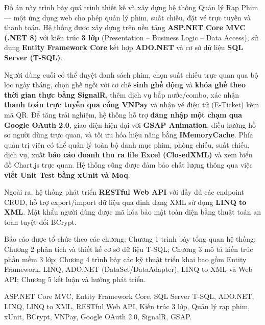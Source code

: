 \documentclass[12pt,a4paper,oneside]{book}
\theoremstyle{plain}
\numberwithin{equation}{chapter}
\begin{document}
Đồ án này trình bày quá trình thiết kế và xây dựng hệ thống Quản lý Rạp Phim --- một ứng dụng web cho phép quản lý phim, suất chiếu, đặt vé trực tuyến và thanh toán. Hệ thống được xây dựng trên nền tảng \textbf{ASP.NET Core MVC (.NET 8)} với kiến trúc \textbf{3 lớp} (Presentation -- Business Logic -- Data Access), sử dụng \textbf{Entity Framework Core} kết hợp \textbf{ADO.NET} và cơ sở dữ liệu \textbf{SQL Server (T-SQL)}.

Người dùng cuối có thể duyệt danh sách phim, chọn suất chiếu trực quan qua bộ lọc ngày tháng, chọn ghế ngồi với cơ chế \textbf{sinh ghế động} và \textbf{khóa ghế theo thời gian thực bằng SignalR}, thêm dịch vụ bắp nước/combo, xác nhận \textbf{thanh toán trực tuyến qua cổng VNPay} và nhận vé điện tử (E-Ticket) kèm mã QR. Để tăng trải nghiệm, hệ thống hỗ trợ \textbf{đăng nhập một chạm qua Google OAuth 2.0}, giao diện hiện đại với \textbf{GSAP Animation}, điều hướng hồ sơ người dùng trực quan, và tối ưu hóa hiệu năng bằng \textbf{IMemoryCache}. Phía quản trị viên có thể quản lý toàn bộ danh mục phim, phòng chiếu, suất chiếu, dịch vụ, xuất \textbf{báo cáo doanh thu ra file Excel (ClosedXML)} và xem biểu đồ Chart.js trực quan. Hệ thống cũng được đảm bảo chất lượng thông qua việc \textbf{viết Unit Test bằng xUnit và Moq}.

Ngoài ra, hệ thống phát triển \textbf{RESTful Web API} với đầy đủ các endpoint CRUD, hỗ trợ export/import dữ liệu qua định dạng XML sử dụng \textbf{LINQ to XML}. Mật khẩu người dùng được mã hóa bảo mật toàn diện bằng thuật toán an toàn tuyệt đối BCrypt.

Báo cáo được tổ chức theo các chương: Chương 1 trình bày tổng quan hệ thống; Chương 2 phân tích và thiết kế cơ sở dữ liệu T-SQL; Chương 3 mô tả kiến trúc phần mềm 3 lớp; Chương 4 trình bày các kỹ thuật triển khai bao gồm Entity Framework, LINQ, ADO.NET (DataSet/DataAdapter), LINQ to XML và Web API; Chương 5 kết luận và hướng phát triển.

 ASP.NET Core MVC, Entity Framework Core, SQL Server T-SQL, ADO.NET, LINQ, LINQ to XML, RESTful Web API, Kiến trúc 3 lớp, Quản lý rạp phim, xUnit, BCrypt, VNPay, Google OAuth 2.0, SignalR, GSAP.

\newpage
\tableofcontents

\newpage
{}
\listoffigures

\newpage
{}
\listoftables

\newpage
{}
\end{document}
